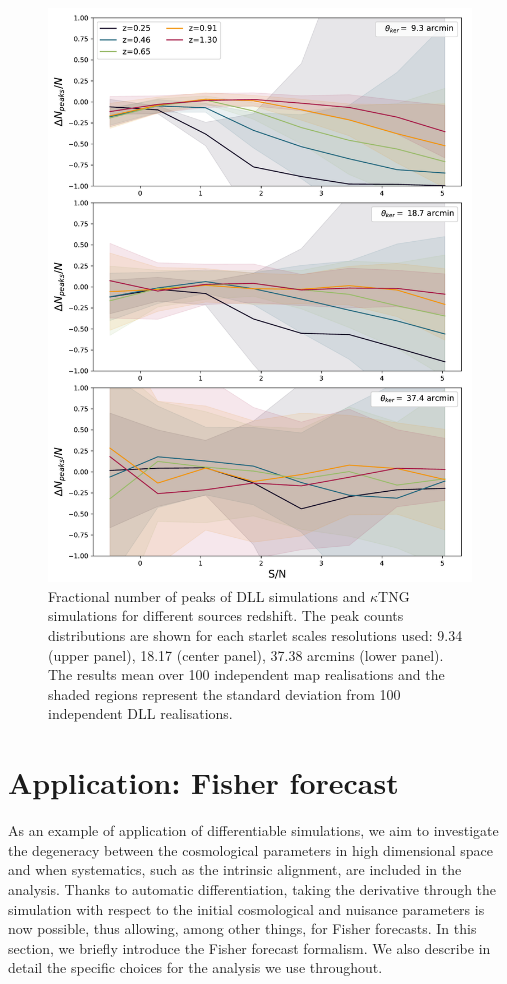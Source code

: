 \documentclass{aa}
\begin{document}
\begin{figure}\label{peaks_z}
    \centering
    \includegraphics[width=\columnwidth]{paper/figures/res_peak_DLL_vs_ktng.pdf}
    \caption{Fractional number of peaks of DLL simulations and $\kappa$TNG simulations for different sources redshift. The peak counts distributions are shown for each starlet scales resolutions used: 9.34 (upper panel), 18.17 (center panel), 37.38 arcmins (lower panel).
  The results mean over 100 independent map realisations and the shaded regions represent the standard deviation from 100 independent DLL realisations.}
\end{figure}


\section{Application: Fisher forecast
}\label{Application_Fisher_forecast_for_HOS}
As an example of application of differentiable simulations, we aim to investigate the degeneracy between the cosmological parameters in high dimensional space and when systematics, such as the intrinsic alignment, are included in the analysis. Thanks to automatic differentiation, 
taking the derivative through the simulation with respect to the initial cosmological and nuisance parameters is now possible, thus allowing, among other things, for Fisher forecasts.
In this section, we briefly introduce the Fisher forecast formalism. We also describe in detail the specific choices for the analysis we use throughout.
\end{document}
